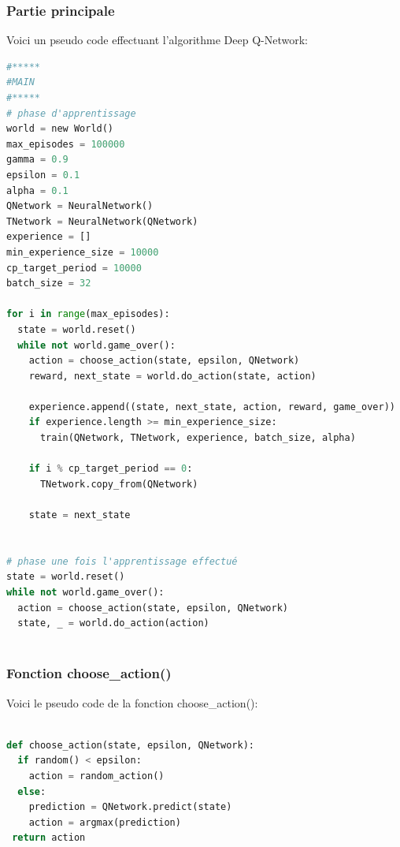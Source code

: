 \documentclass[11pt,a4paper]{report}
\begin{document}
   \subsubsection{Partie principale}
   
   \par Voici un pseudo code effectuant l'algorithme Deep Q-Network: 
   
   \begin{lstlisting}[language=python]
#*****
#MAIN
#*****
# phase d'apprentissage
world = new World()
max_episodes = 100000
gamma = 0.9
epsilon = 0.1
alpha = 0.1
QNetwork = NeuralNetwork()
TNetwork = NeuralNetwork(QNetwork)
experience = []
min_experience_size = 10000
cp_target_period = 10000
batch_size = 32
  
for i in range(max_episodes):
  state = world.reset()
  while not world.game_over():
    action = choose_action(state, epsilon, QNetwork)
    reward, next_state = world.do_action(state, action)

    experience.append((state, next_state, action, reward, game_over)) 
    if experience.length >= min_experience_size:
      train(QNetwork, TNetwork, experience, batch_size, alpha)

    if i % cp_target_period == 0:
      TNetwork.copy_from(QNetwork)
        
    state = next_state
    
        
# phase une fois l'apprentissage effectué
state = world.reset()
while not world.game_over():
  action = choose_action(state, epsilon, QNetwork)
  state, _ = world.do_action(action)
        
  \end{lstlisting} 

   \subsubsection{Fonction choose\_action()}

   \par Voici le pseudo code de la fonction choose\_action():  
  
  \begin{lstlisting}[language=python]
  
def choose_action(state, epsilon, QNetwork):
  if random() < epsilon:
    action = random_action()
  else:
    prediction = QNetwork.predict(state)
    action = argmax(prediction)
 return action
 
  \end{lstlisting} 
  
\end{document}
